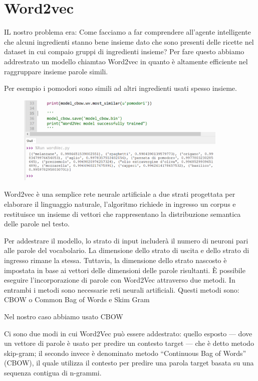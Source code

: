 \documentclass[12pt]{report}
\begin{document}
\section{Word2vec}

IL nostro problema era: Come facciamo a far comprendere all’agente intelligente che alcuni ingredienti stanno bene insieme dato che sono presenti delle ricette nel dataset in cui compaio gruppi di ingredienti insieme?
Per fare questo abbiamo addrestrato un modello chiamtao Word2vec in quanto è  altamente efficiente nel raggruppare insieme parole simili.

Per esempio i pomodori sono simili ad altri ingredienti usati spesso insieme. 

\begin{figure}[H]
        \centering
        {\includegraphics[width=0.9\textwidth]{img/img13.jpg}}
\end{figure}

Word2vec è una semplice rete neurale artificiale a due strati progettata per elaborare il linguaggio naturale, l'algoritmo richiede in ingresso un corpus e restituisce un insieme di vettori che rappresentano la distribuzione semantica delle parole nel testo.

Per addestrare il modello, lo strato di input includerà il numero di neuroni pari alle parole del vocabolario. La dimensione dello strato di uscita e dello strato di ingresso rimane la stessa. Tuttavia, la dimensione dello strato nascosto è impostata in base ai vettori delle dimensioni delle parole risultanti. È possibile eseguire l’incorporazione di parole con Word2Vec attraverso due metodi. In entrambi i metodi sono necessarie reti neurali artificiali. Questi metodi sono: CBOW o Common Bag of Words e Skim Gram

Nel nostro caso abbiamo usato CBOW

Ci sono due modi in cui Word2Vec può essere addestrato: quello esposto — dove un vettore di parole è usato per predire un contesto target — che è detto metodo skip-gram; il secondo invece è denominato metodo “Continuous Bag of Words” (CBOW), il quale utilizza il contesto per predire una parola target basata su una sequenza contigua di n-grammi.
\end{document}
